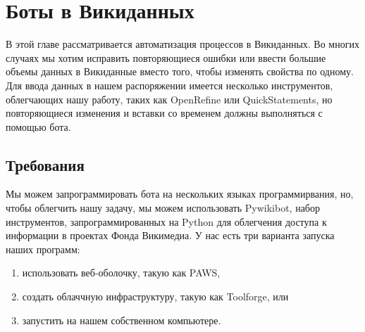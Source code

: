 \chapter{Боты в Викиданных}
\label{ch:bots}
В этой главе рассматривается автоматизация процессов в Викиданных. Во многих случаях мы хотим исправить повторяющиеся ошибки или ввести большие объемы данных в Викиданные вместо того, чтобы изменять свойства по одному. Для ввода данных в нашем распоряжении имеется несколько инструментов, облегчающих нашу работу, таких как OpenRefine или QuickStatements, но повторяющиеся изменения и вставки со временем должны выполняться с помощью бота.


\section{Требования}
\label{sec:requirements}
Мы можем запрограммировать бота на нескольких языках программирвания, но, чтобы облегчить нашу задачу, мы можем использовать Pywikibot, набор инструментов, запрограммированных на Python для облегчения доступа к информации в проектах Фонда Викимедиа. У нас есть три варианта запуска наших программ:
\begin{enumerate}
  \setlength{\itemindent}{2em}
  \item использовать веб-оболочку, такую как PAWS,
  \item создать облаччную инфраструктуру, такую как Toolforge, или 
  \item запустить на нашем собственном компьютере.
\end{enumerate}